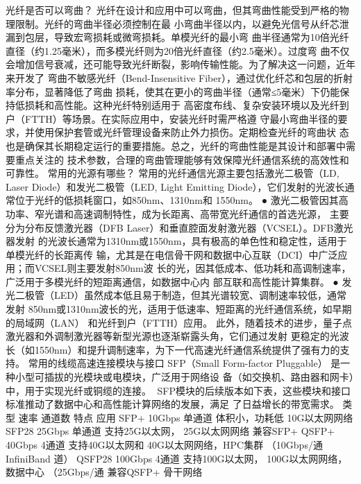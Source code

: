 光纤是否可以弯曲？
光纤在设计和应用中可以弯曲，但其弯曲性能受到严格的物理限制。光纤的弯曲半径必须控制在最
小弯曲半径以内，以避免光信号从纤芯泄漏到包层，导致宏弯损耗或微弯损耗。单模光纤的最小弯
曲半径通常为10倍光纤直径（约1.25毫米），而多模光纤则为20倍光纤直径（约2.5毫米）。过度弯
曲不仅会增加信号衰减，还可能导致光纤断裂，影响传输性能。为了解决这一问题，近年来开发了
弯曲不敏感光纤（Bend-Insensitive Fiber），通过优化纤芯和包层的折射率分布，显著降低了弯曲
损耗，使其在更小的弯曲半径（通常≤5毫米）下仍能保持低损耗和高性能。这种光纤特别适用于
高密度布线、复杂安装环境以及光纤到户（FTTH）等场景。在实际应用中，安装光纤时需严格遵
守最小弯曲半径的要求，并使用保护套管或光纤管理设备来防止外力损伤。定期检查光纤的弯曲状
态也是确保其长期稳定运行的重要措施。总之，光纤的弯曲性能是其设计和部署中需要重点关注的
技术参数，合理的弯曲管理能够有效保障光纤通信系统的高效性和可靠性。
常用的光源有哪些？
常用的光纤通信光源主要包括激光二极管（LD, Laser Diode）和发光二极管（LED, Light
Emitting Diode），它们发射的光波长通常位于光纤的低损耗窗口，如850nm、1310nm和
1550nm。
  ● 激光二极管因其高功率、窄光谱和高速调制特性，成为长距离、高带宽光纤通信的首选光源，
    主要分为分布反馈激光器（DFB Laser）和垂直腔面发射激光器（VCSEL）。DFB激光器发射
    的光波长通常为1310nm或1550nm，具有极高的单色性和稳定性，适用于单模光纤的长距离传
    输，尤其是在电信骨干网和数据中心互联（DCI）中广泛应用；而VCSEL则主要发射850nm波
    长的光，因其低成本、低功耗和高调制速率，广泛用于多模光纤的短距离通信，如数据中心内
    部互联和高性能计算集群。
  ● 发光二极管（LED）虽然成本低且易于制造，但其光谱较宽、调制速率较低，通常发射
    850nm或1310nm波长的光，适用于低速率、短距离的光纤通信系统，如早期的局域网（LAN）
    和光纤到户（FTTH）应用。
此外，随着技术的进步，量子点激光器和外调制激光器等新型光源也逐渐崭露头角，它们通过发射
更稳定的光波长（如1550nm）和提升调制速率，为下一代高速光纤通信系统提供了强有力的支
持。
常用的线缆高速连接模块与接口
SFP（Small Form-factor Pluggable） 是一种小型可插拔的光模块或电模块，广泛用于网络设
备（如交换机、路由器和网卡）中，用于实现光纤或铜缆的连接。
SFP模块的后续版本如下表，这些模块和接口标准推动了数据中心和高性能计算网络的发展，满足
了日益增长的带宽需求。
 类型     速率      通道数       特点         应用
 SFP+ 10Gbps 单通道          体积小，功耗低 10G以太网网络
 SFP28 25Gbps 单通道         支持25G以太网， 25G以太网网络
                          兼容SFP+
 QSFP+ 40Gbps 4通道         支持40G以太网和 40G以太网网络，HPC集群
                （10Gbps/通 InfiniBand
                道）
 QSFP28 100Gbps 4通道       支持100G以太网， 100G以太网网络，数据中心
                （25Gbps/通 兼容QSFP+    骨干网络
